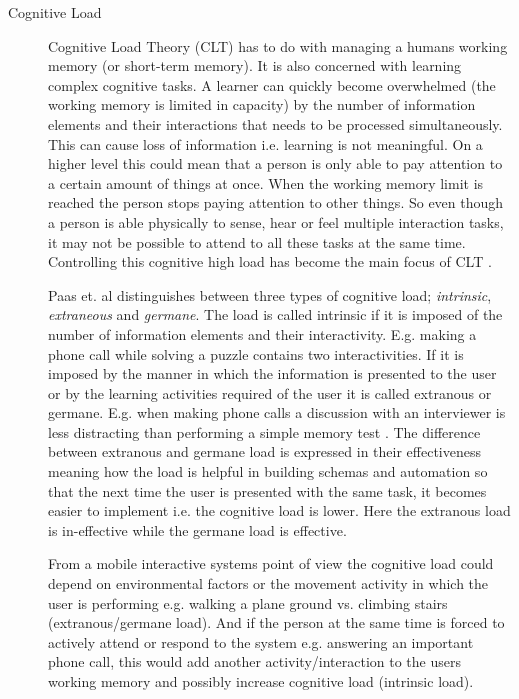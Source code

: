 \begin{description}
\item[Cognitive Load]
Cognitive Load Theory (CLT) has to do with managing a humans working memory (or short-term memory). It is also concerned with learning complex cognitive tasks. A learner can quickly become overwhelmed (the working memory is limited in capacity) by the number of information elements and their interactions that needs to be processed simultaneously. This can cause loss of information i.e. learning is not meaningful. On a higher level this could mean that a person is only able to pay attention to a certain amount of things at once. When the working memory limit is reached the person stops paying attention to other things. So even though a person is able physically to sense, hear or feel multiple interaction tasks, it may not be possible to attend to all these tasks at the same time. Controlling this cognitive high load has become the main focus of CLT \cite{paas_cognitive_2004}.

Paas et. al \cite{paas_cognitive_2004} distinguishes between three types of cognitive load; \textit{intrinsic}, \textit{extraneous} and \textit{germane}. The load is called intrinsic if it is imposed of the number of information elements and their interactivity. E.g. making a phone call while solving a puzzle contains two interactivities. If it is imposed by the manner in which the information is presented to the user or by the learning activities required of the user it is called extranous or germane. E.g. when making phone calls a discussion with an interviewer is less distracting than performing a simple memory test \cite{nunes_cognitive_2002}. The difference between extranous and germane load is expressed in their effectiveness meaning how the load is helpful in building schemas and automation so that the next time the user is presented with the same task, it becomes easier to implement i.e. the cognitive load is lower. Here the extranous load is in-effective while the germane load is effective.

From a mobile interactive systems point of view the cognitive load could depend on environmental factors or the movement activity in which the user is performing e.g. walking a plane ground vs. climbing stairs (extranous/germane load). And if the person at the same time is forced to actively attend or respond to the system e.g. answering an important phone call, this would add another activity/interaction to the users working memory and possibly increase cognitive load (intrinsic load).


\end{description}
